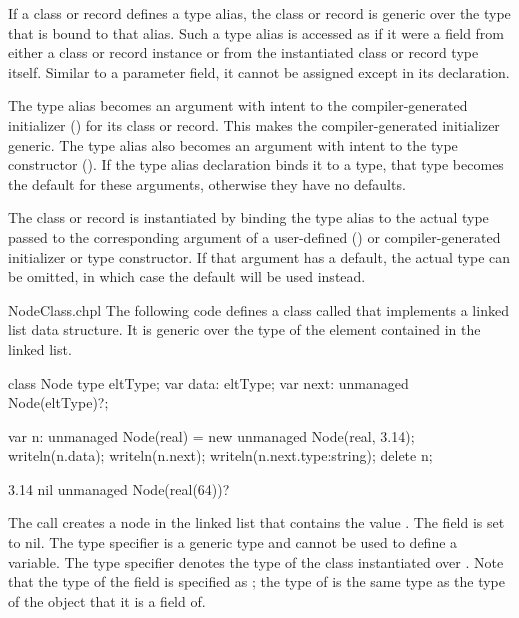 If a class or record defines a type alias, the class or record
is generic over the type that is bound to that alias.
Such a type alias is accessed as if it were a field from either a class
or record instance or from the instantiated class or record type itself.
Similar to a parameter field, it cannot be assigned
except in its declaration.

The type alias becomes an argument with intent  to
the compiler-generated initializer ()
for its class or record. This makes the compiler-generated initializer generic.
The type alias also becomes an argument with intent  to
the type constructor ().
If the type alias declaration binds it to a type, that type
becomes the default for these arguments, otherwise they have no defaults.

The class or record is instantiated by binding the type alias
to the actual type passed to the corresponding argument of
a user-defined ()
or compiler-generated initializer or type constructor.
If that argument has a default, the actual type can be omitted, in
which case the default will be used instead.

\begin{chapelexample}{NodeClass.chpl}
The following code defines a class called  that implements
a linked list data structure.  It is generic over the type of the
element contained in the linked list.
\begin{chapel}
class Node {
  type eltType;
  var data: eltType;
  var next: unmanaged Node(eltType)?;
}
\end{chapel}
\begin{chapelpost}
var n: unmanaged Node(real) = new unmanaged Node(real, 3.14);
writeln(n.data);
writeln(n.next);
writeln(n.next.type:string);
delete n;
\end{chapelpost}
\begin{chapeloutput}
3.14
nil
unmanaged Node(real(64))?
\end{chapeloutput}
The call  creates a node in the linked list
that contains the value .  The  field is set to
nil.  The type specifier  is a generic type and cannot be
used to define a variable.  The type specifier 
denotes the type of the  class instantiated over
.  Note that the type of the  field is specified
as ; the type of  is the same type as
the type of the object that it is a field of.
\end{chapelexample}

